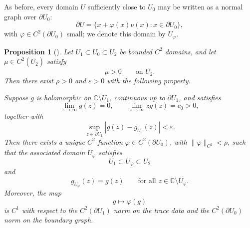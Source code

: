 \documentclass[a4paper,11pt,reqno]{amsart}
\numberwithin{equation}{section}
\theoremstyle{plain} %
\newtheorem{proposition}{Proposition}[section]
\theoremstyle{definition} %
\theoremstyle{remark}
\newcommand{\C}{\mathbb{C}}
\begin{document}
As before, every domain \(U\) sufficiently close to \(U_0\) may be written as a
normal graph over \(\partial U_0\):
\[
\partial U
=
\{x+\varphi(x)\nu(x):x\in \partial U_0\},
\]
with \(\varphi\in C^2(\partial U_0)\) small; we denote this domain by \(U_\varphi\).

\begin{proposition}[\cite{Cherednichenko}]\label{prop:cherednichenko-tailored}
Let \(U_1\subset U_0\subset U_2\) be bounded \(C^2\) domains, and let
\(\mu\in C^2(\overline{U_2})\) satisfy
\[
\mu>0 \qquad \text{on }\overline{U_2}.
\]
Then there exist \(\rho>0\) and \(\varepsilon>0\) with the following property.

Suppose \(g\) is holomorphic on \(\C\setminus \overline{U_1}\), continuous up to
\(\partial U_1\), and satisfies
\begin{equation}\label{eq:appendix-g-hypotheses}
\lim_{z\to\infty} g(z)=0,
\qquad
\lim_{z\to\infty} zg(z)=c_0>0,
\end{equation}
together with
\[
\sup_{z\in \partial U_1}|g(z)-g_{U_0}(z)|<\varepsilon.
\]
Then there exists a unique \(C^2\) function
\(\varphi\in C^2(\partial U_0)\), with \(\|\varphi\|_{C^2}<\rho\), such that the
associated domain \(U_\varphi\) satisfies
\[
U_1\subset U_\varphi\subset U_2
\]
and
\[
g_{U_\varphi}(z)=g(z)
\qquad \text{for all } z\in \C\setminus \overline{U_\varphi}.
\]
Moreover, the map
\[
g\mapsto \varphi(g)
\]
is \(C^1\) with respect to the \(C^2(\partial U_1)\) norm on the trace data and
the \(C^2(\partial U_0)\) norm on the boundary graph.
\end{proposition}
\end{document}
